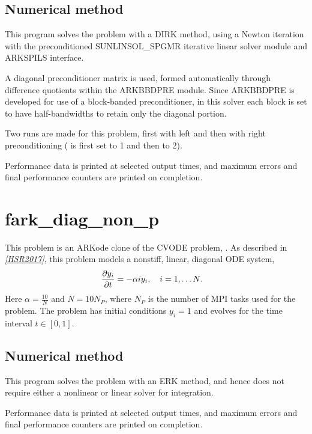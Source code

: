 \documentclass[letterpaper,10pt,english]{sphinxmanual}
\begin{document}
\subsection{Numerical method}
\label{f77_parallel:numerical-method}
This program solves the problem with a DIRK method, using a Newton
iteration with the preconditioned SUNLINSOL\_SPGMR iterative linear
solver module and ARKSPILS interface.

A diagonal preconditioner matrix is used, formed automatically through
difference quotients within the ARKBBDPRE module.  Since ARKBBDPRE is
developed for use of a block-banded preconditioner, in this solver
each block is set to have half-bandwidths  to
retain only the diagonal portion.

Two runs are made for this problem, first with left and then with
right preconditioning ( is first set to 1 and then to 2).

Performance data is printed at selected output times, and maximum
errors and final performance counters are printed on completion.


\section{fark\_diag\_non\_p}
\label{f77_parallel:fark-diag-non-p}\label{f77_parallel:id3}
This problem is an ARKode clone of the CVODE problem,
.  As described in \label{f77_parallel:id4}{\hyperref[References:hsr2017]{\emph{{[}HSR2017{]}}}}, this problem models a
nonstiff, linear, diagonal ODE system,
\begin{gather}
\begin{split}\frac{\partial y_i}{\partial t} &= -\alpha i y_i, \quad i=1,\ldots N.\end{split}\notag
\end{gather}
Here \(\alpha=\frac{10}{N}\) and \(N=10 N_P\), where \(N_P\) is the
number of MPI tasks used for the problem.  The problem has initial
conditions \(y_i=1\) and evolves for the time interval \(t\in [0,1]\).


\subsection{Numerical method}
\label{f77_parallel:id5}
This program solves the problem with an ERK method, and hence does not
require either a nonlinear or linear solver for integration.

Performance data is printed at selected output times, and maximum
errors and final performance counters are printed on completion.
\end{document}
